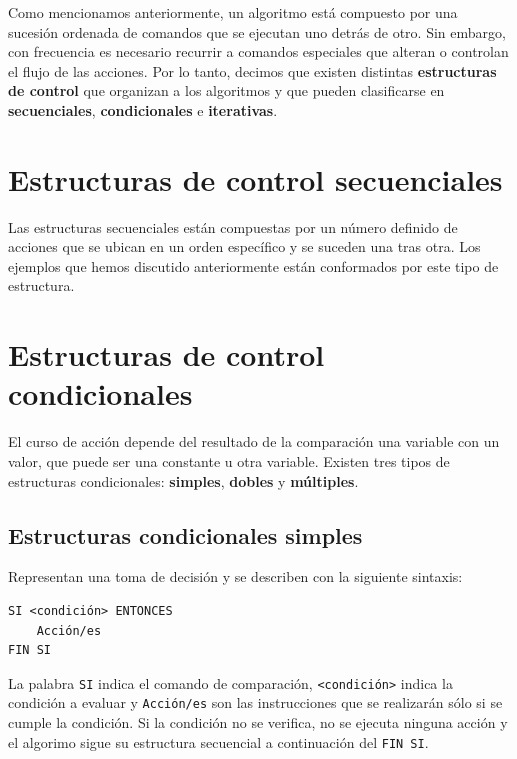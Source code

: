 \documentclass[]{book}
\begin{document}
Como mencionamos anteriormente, un algoritmo está compuesto por una sucesión ordenada de comandos que se ejecutan uno detrás de otro. Sin embargo, con frecuencia es necesario recurrir a comandos especiales que alteran o controlan el flujo de las acciones. Por lo tanto, decimos que existen distintas \textbf{estructuras de control} que organizan a los algoritmos y que pueden clasificarse en \textbf{secuenciales}, \textbf{condicionales} e \textbf{iterativas}.

\hypertarget{estructuras-de-control-secuenciales}{%
\section{Estructuras de control secuenciales}\label{estructuras-de-control-secuenciales}}

Las estructuras secuenciales están compuestas por un número definido de acciones que se ubican en un orden específico y se suceden una tras otra. Los ejemplos que hemos discutido anteriormente están conformados por este tipo de estructura.

\hypertarget{estructuras-de-control-condicionales}{%
\section{Estructuras de control condicionales}\label{estructuras-de-control-condicionales}}

El curso de acción depende del resultado de la comparación una variable con un valor, que puede ser una constante u otra variable. Existen tres tipos de estructuras condicionales: \textbf{simples}, \textbf{dobles} y \textbf{múltiples}.

\hypertarget{estructuras-condicionales-simples}{%
\subsection{Estructuras condicionales simples}\label{estructuras-condicionales-simples}}

Representan una toma de decisión y se describen con la siguiente sintaxis:

\begin{verbatim}
SI <condición> ENTONCES
    Acción/es
FIN SI
\end{verbatim}

La palabra \texttt{SI} indica el comando de comparación, \texttt{\textless{}condición\textgreater{}} indica la condición a evaluar y \texttt{Acción/es} son las instrucciones que se realizarán sólo si se cumple la condición. Si la condición no se verifica, no se ejecuta ninguna acción y el algorimo sigue su estructura secuencial a continuación del \texttt{FIN\ SI}.
\end{document}

